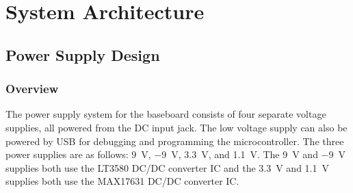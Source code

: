 \documentclass[12pt, titlepage]{article}
\begin{document}
\section{System Architecture}

\subsection{Power Supply Design}

\subsubsection{Overview}

The power supply system for the baseboard consists of four separate voltage supplies, all powered from the DC input jack. The low voltage supply can also be powered by USB for debugging and programming the microcontroller. The three power supplies are as follows: \SI{+9}{\volt}, \SI{-9}{\volt}, \SI{+3.3}{\volt}, and \SI{+1.1}{\volt}. The \SI{+9}{\volt} and \SI{-9}{\volt} supplies both use the LT3580 DC/DC converter IC and the \SI{+3.3}{\volt} and \SI{+1.1}{\volt} supplies both use the MAX17631 DC/DC converter IC.
\end{document}
